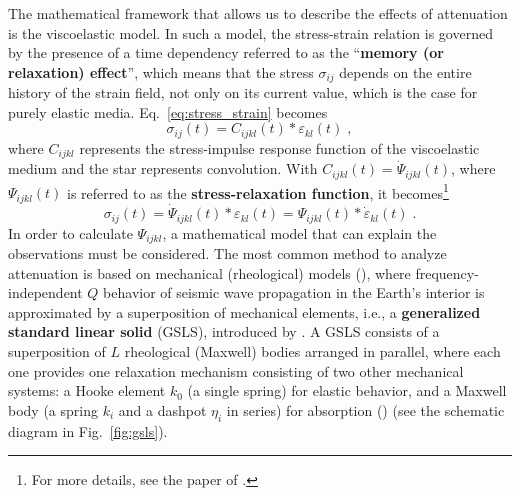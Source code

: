 The mathematical framework that allows us to describe the effects of attenuation is the viscoelastic model. In such a model, the stress-strain relation is governed by the presence of a time dependency referred to as the \enquote{\textbf{memory (or relaxation) effect}}, which means that the stress $\sigma_{ij}$ depends on the entire history of the strain field, not only on its current value, which is the case for purely elastic media. Eq.~\ref{eq:stress_strain} becomes
\begin{equation}
    \sigma_{ij}(t) = C_{ijkl}(t) \ast \varepsilon_{kl}(t)\;,
    \label{eq:stress_strain_visco}
\end{equation}
where $C_{ijkl}$ represents the stress-impulse response function of the viscoelastic medium and the star represents convolution. %
With $C_{ijkl}(t) = \dot{\Psi}_{ijkl}(t)$, where $\Psi_{ijkl}(t)$ is referred to as the \textbf{stress-relaxation function}, it becomes\footnote{For more details, see the paper of \citet{Bai:16}.}
\begin{equation}
    \sigma_{ij}(t) = \dot{\Psi}_{ijkl}(t) \ast \varepsilon_{kl}(t) = \Psi_{ijkl}(t) \ast \dot{\varepsilon}_{kl}(t)\;.
    \label{eq:stress_strain_visco_2.0}
\end{equation}
In order to calculate $\Psi_{ijkl}$, a mathematical model that can explain the observations must be considered. The most common method to analyze attenuation is based on mechanical (rheological) models (\cite{knopoff:58}), where frequency-independent $Q$ behavior of seismic wave propagation in the Earth's interior is approximated by a superposition of mechanical  elements, i.e., a \textbf{generalized standard linear solid} (GSLS), introduced by \citet{liu:76}. A GSLS consists of a superposition of $L$ rheological (Maxwell) bodies arranged in parallel, where each one provides one relaxation mechanism consisting of two other mechanical systems: a Hooke element $k_0$ (a single spring) for elastic behavior, and a Maxwell body (a spring $k_i$ and a dashpot $\eta_i$ in series) for absorption (\cite{blanch:95}) (see the schematic diagram in Fig.~\ref{fig:gsls}).

